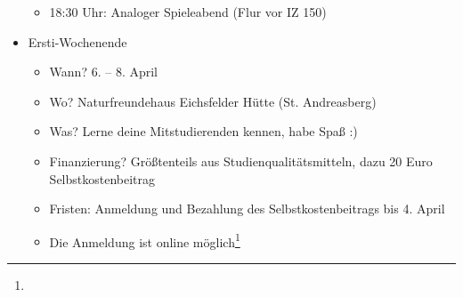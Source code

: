 \begin{itemize}
	\begin{itemize}
		\item 18:30 Uhr: Analoger Spieleabend (Flur vor IZ 150)
	\end{itemize}
	\item Ersti-Wochenende
	\begin{itemize}
		\item Wann? 6. – 8. April
		\item Wo? Naturfreundehaus Eichsfelder Hütte (St. Andreasberg)
		\item Was? Lerne deine Mitstudierenden kennen, habe Spaß :)
		\item Finanzierung? Größtenteils aus Studienqualitätsmitteln, dazu 20 Euro Selbstkostenbeitrag
		\item Fristen: Anmeldung und Bezahlung des Selbstkostenbeitrags bis 4. April
		\item Die Anmeldung ist online möglich\footnote{}
	\end{itemize}
\end{itemize}